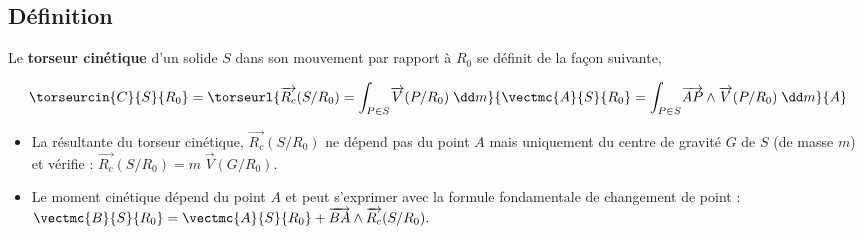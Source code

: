\subsection{Définition}
  \begin{definition}%
Le \textbf{torseur cinétique} d'un solide $S$ dans son mouvement par rapport à $R_0$ se définit de la façon suivante,

$$
\torseurcin{C}{S}{R_0}=\torseurl{\overrightarrow{R_c}(S/R_0)=\displaystyle{\int_{P\in S}}\overrightarrow{V}(P/R_0)\;\dd m}{\vectmc{A}{S}{R_0}=\displaystyle{\int_{P\in S}}\overrightarrow{AP}\wedge \overrightarrow{V}(P/R_0)\;\dd m}{A}
$$

\begin{itemize}
\item La résultante du torseur cinétique, $\overrightarrow{R_c}(S/R_0)$ ne dépend pas du point $A$ mais uniquement du centre de gravité $G$ de $S$ (de masse $m$) et vérifie :
$\overrightarrow{R_c}(S/R_0)=m\;\overrightarrow{V}(G/R_0).
$
\item Le moment cinétique dépend du point $A$ et peut s'exprimer avec la formule fondamentale de changement de point :
$
\vectmc{B}{S}{R_0}=\vectmc{A}{S}{R_0}+\overrightarrow{BA}\wedge \overrightarrow{R_c}(S/R_0).
$
\end{itemize}

\end{definition}


%
%
%
%
%
%

